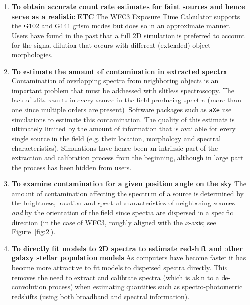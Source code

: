 \documentclass[preprint]{aastex}
\begin{document}
\begin{enumerate}
\item {\bf To obtain accurate count rate estimates for faint sources and hence serve as a realistic ETC}
The WFC3 Exposure Time Calculator supports the G102 and G141 grism modes but does so in an approximate manner. Users have found in the past that a full 2D simulation is preferred to account for the signal dilution that occurs with different (extended) object morphologies.  


\item {\bf To estimate the amount of contamination in extracted spectra}
Contamination of overlapping spectra from neighboring objects is an important problem that must be addressed with slitless spectroscopy. The lack of slits results in every source in the field producing spectra (more than one since multiple orders are present). Software packages such as \texttt{aXe} use simulations to estimate this contamination. The quality of this estimate is ultimately limited by the amount of information that is available for every single source in the field (e.g. their location, morphology and spectral characteristics). Simulations have hence been an intrinsic part of the extraction and calibration process from the beginning, although in large part the process has been hidden from users.

\item {\bf To examine contamination for a given position angle on the sky}
The amount of contamination affecting the spectrum of a source is determined by the brightness, location and spectral characteristics of neighboring sources {\em and} by the orientation of the field since spectra are dispersed in a specific direction (in the case of WFC3, roughly aligned with the $x$-axis; see Figure~\ref{fig:2}).

\item {\bf To directly fit models to 2D spectra to estimate redshift and other galaxy stellar population models}
As computers have become faster it has become more attractive to fit models to dispersed spectra directly. This removes the need to extract and calibrate spectra (which is akin to a de-convolution process) when estimating quantities such as spectro-photometric redshifts (using both broadband and spectral information).

\end{enumerate}

\end{document}
